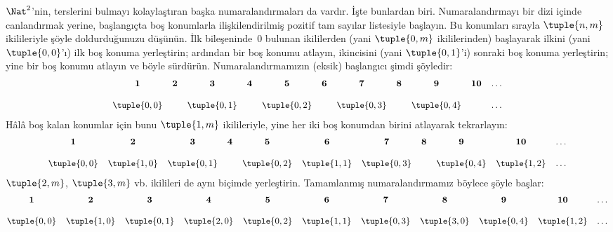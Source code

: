 \documentclass[../../../include/open-logic-section]{subfiles}
\begin{document}


\begin{explain}
$\Nat^2$'nin, terslerini bulmayı kolaylaştıran başka numaralandırmaları da
vardır. İşte bunlardan biri. Numaralandırmayı bir dizi içinde canlandırmak
yerine, başlangıçta boş konumlarla ilişkilendirilmiş pozitif tam sayılar
listesiyle başlayın. Bu konumları sırayla $\tuple{n,m}$ ikilileriyle şöyle
doldurduğunuzu düşünün. İlk bileşeninde~$0$ bulunan ikililerden (yani
$\tuple{0,m}$ ikililerinden) başlayarak ilkini (yani $\tuple{0,0}$'ı) ilk
boş konuma yerleştirin; ardından bir boş konumu atlayın, ikincisini (yani
$\tuple{0,1}$'i) sonraki boş konuma yerleştirin; yine bir boş konumu atlayın
ve böyle sürdürün. Numaralandırmamızın (eksik) başlangıcı şimdi şöyledir:
\[\small
\begin{array}{@{}c c c c c c c c c c c@{}}
\mathbf 1 & \mathbf 2 & \mathbf 3 & \mathbf 4 & \mathbf 5 & \mathbf 6 & \mathbf 7 & \mathbf 8 & \mathbf 9 & \mathbf{10} & \dots \\ \\
\tuple{0,0} &  & \tuple{0,1} &  & \tuple{0,2} &  & \tuple{0,3} & & \tuple{0,4} &  & \dots \\
\end{array}
\]
Hâlâ boş kalan konumlar için bunu $\tuple{1,m}$ ikilileriyle, yine her iki
boş konumdan birini atlayarak tekrarlayın:
\[\small
\begin{array}{@{}c c c c c c c c c c c@{}}
\mathbf 1 & \mathbf 2 & \mathbf 3 & \mathbf 4 & \mathbf 5 & \mathbf 6 & \mathbf 7 & \mathbf 8 & \mathbf 9 & \mathbf{10} & \dots \\ \\
\tuple{0,0} & \tuple{1,0} & \tuple{0,1} &  & \tuple{0,2} & \tuple{1,1} &
\tuple{0,3} & & \tuple{0,4} &  \tuple{1,2} & \dots \\
\end{array}
\]
$\tuple{2,m}$, $\tuple{3,m}$ vb. ikilileri de aynı biçimde yerleştirin.
Tamamlanmış numaralandırmamız böylece şöyle başlar:
\[\small
\begin{array}{@{}cc c c c c c c c c c@{}}
\mathbf 1 & \mathbf 2 & \mathbf 3 & \mathbf 4 & \mathbf 5 & \mathbf 6 & \mathbf 7 & \mathbf 8 & \mathbf 9 & \mathbf{10} & \dots \\ \\
\tuple{0,0} & \tuple{1,0} & \tuple{0,1} & \tuple{2,0}  & \tuple{0,2} &
\tuple{1,1} & \tuple{0,3} & \tuple{3,0}  & \tuple{0,4} &  \tuple{1,2} & \dots \\

\end{array}\]
\end{explain}
\end{document}
